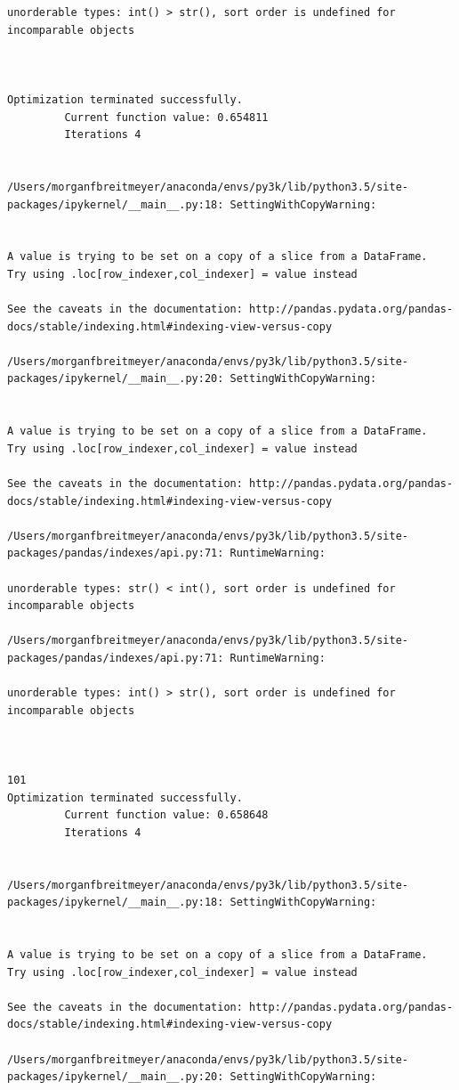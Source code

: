 \begin{lstlisting}
unorderable types: int() > str(), sort order is undefined for incomparable objects



Optimization terminated successfully.
         Current function value: 0.654811
         Iterations 4


/Users/morganfbreitmeyer/anaconda/envs/py3k/lib/python3.5/site-packages/ipykernel/__main__.py:18: SettingWithCopyWarning:


A value is trying to be set on a copy of a slice from a DataFrame.
Try using .loc[row_indexer,col_indexer] = value instead

See the caveats in the documentation: http://pandas.pydata.org/pandas-docs/stable/indexing.html#indexing-view-versus-copy

/Users/morganfbreitmeyer/anaconda/envs/py3k/lib/python3.5/site-packages/ipykernel/__main__.py:20: SettingWithCopyWarning:


A value is trying to be set on a copy of a slice from a DataFrame.
Try using .loc[row_indexer,col_indexer] = value instead

See the caveats in the documentation: http://pandas.pydata.org/pandas-docs/stable/indexing.html#indexing-view-versus-copy

/Users/morganfbreitmeyer/anaconda/envs/py3k/lib/python3.5/site-packages/pandas/indexes/api.py:71: RuntimeWarning:

unorderable types: str() < int(), sort order is undefined for incomparable objects

/Users/morganfbreitmeyer/anaconda/envs/py3k/lib/python3.5/site-packages/pandas/indexes/api.py:71: RuntimeWarning:

unorderable types: int() > str(), sort order is undefined for incomparable objects



101
Optimization terminated successfully.
         Current function value: 0.658648
         Iterations 4


/Users/morganfbreitmeyer/anaconda/envs/py3k/lib/python3.5/site-packages/ipykernel/__main__.py:18: SettingWithCopyWarning:


A value is trying to be set on a copy of a slice from a DataFrame.
Try using .loc[row_indexer,col_indexer] = value instead

See the caveats in the documentation: http://pandas.pydata.org/pandas-docs/stable/indexing.html#indexing-view-versus-copy

/Users/morganfbreitmeyer/anaconda/envs/py3k/lib/python3.5/site-packages/ipykernel/__main__.py:20: SettingWithCopyWarning:



\end{lstlisting}
